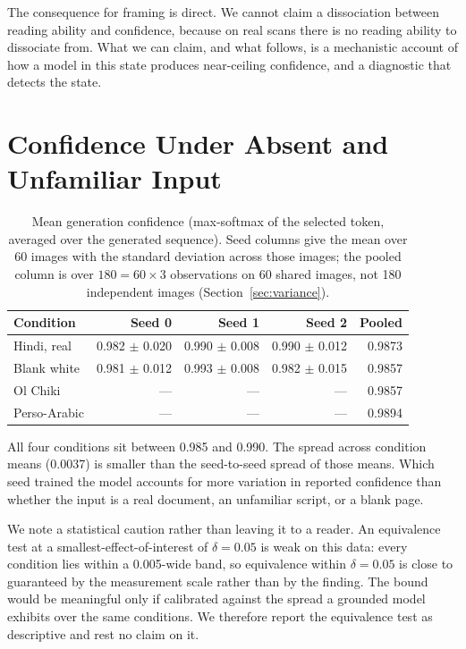 \documentclass{article}
\begin{document}
The consequence for framing is direct. We cannot claim a dissociation between reading ability
and confidence, because on real scans there is no reading ability to dissociate from. What we
can claim, and what follows, is a mechanistic account of how a model in this state produces
near-ceiling confidence, and a diagnostic that detects the state.

\section{Confidence Under Absent and Unfamiliar Input}

\begin{table}[h]
\small
\centering
\caption{Mean generation confidence (max-softmax of the selected token, averaged over the
generated sequence). Seed columns give the mean over 60 images with the standard deviation
across those images; the pooled column is over $180 = 60 \times 3$ observations on 60 shared
images, not 180 independent images (Section~\ref{sec:variance}).}
\label{tab:conf}
\begin{tabular}{lrrrr}
\toprule
Condition & Seed 0 & Seed 1 & Seed 2 & Pooled \\
\midrule
Hindi, real  & 0.982 $\pm$ 0.020 & 0.990 $\pm$ 0.008 & 0.990 $\pm$ 0.012 & 0.9873 \\
Blank white  & 0.981 $\pm$ 0.012 & 0.993 $\pm$ 0.008 & 0.982 $\pm$ 0.015 & 0.9857 \\
Ol Chiki     & --- & --- & --- & 0.9857 \\
Perso-Arabic & --- & --- & --- & 0.9894 \\
\bottomrule
\end{tabular}
\end{table}

All four conditions sit between 0.985 and 0.990. The spread across condition means (0.0037) is
smaller than the seed-to-seed spread of those means. Which seed trained the model accounts for
more variation in reported confidence than whether the input is a real document, an unfamiliar
script, or a blank page.

We note a statistical caution rather than leaving it to a reader. An equivalence test at a
smallest-effect-of-interest of $\delta = 0.05$ is weak on this data: every condition lies
within a 0.005-wide band, so equivalence within $\delta = 0.05$ is close to guaranteed by the
measurement scale rather than by the finding. The bound would be meaningful only if calibrated
against the spread a grounded model exhibits over the same conditions. We therefore report the
equivalence test as descriptive and rest no claim on it.
\end{document}
